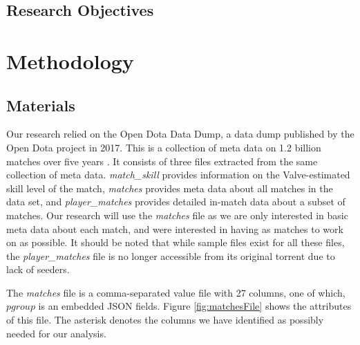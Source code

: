 \subsection{Research Objectives} %

\section{Methodology} %

\subsection{Materials} %

Our research relied on the Open Dota Data Dump, a data dump published by the Open Dota project in 2017. This is a collection of meta data on 1.2 billion matches over five years \cite{theopendotaprojectDataDumpMarch2017}. It consists of three files extracted from the same collection of meta data. \emph{match\_skill} provides information on the Valve-estimated skill level of the match, \emph{matches} provides meta data about all matches in the data set, and \emph{player\_matches} provides detailed in-match data about a subset of matches. Our research will use the \emph{matches} file as we are only interested in basic meta data about each match, and were interested in having as matches to work on as possible. It should be noted that while sample files exist for all these files, the \emph{player\_matches} file is no longer accessible from its original torrent due to lack of seeders.

The \emph{matches} file is a comma-separated value file with 27 columns, one of which, $pgroup$ is an embedded JSON fields. Figure \ref{fig:matchesFile} shows the attributes of this file. The asterisk denotes the columns we have identified as possibly needed for our analysis.

